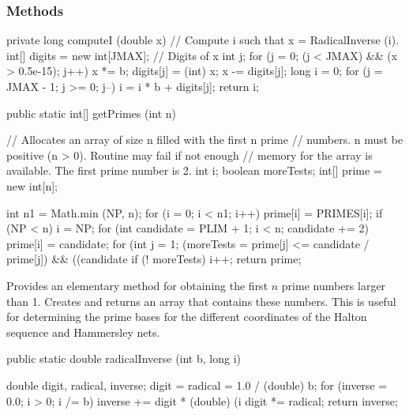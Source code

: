 \subsubsection* {Methods}
\begin{code}\begin{hide}
   private long computeI (double x) {
      // Compute i such that x = RadicalInverse (i).
      int[] digits = new int[JMAX];              // Digits of x
      int j;
      for (j = 0; (j < JMAX) && (x > 0.5e-15); j++) {
         x *= b;
         digits[j] = (int) x;
         x -= digits[j];
      }
      long i = 0;
      for (j = JMAX - 1; j >= 0; j--) {
         i = i * b + digits[j];
      }
      return i;
   }\end{hide}

   public static int[] getPrimes (int n) \begin{hide} {
      // Allocates an array of size n filled with the first n prime
      // numbers. n must be positive (n > 0). Routine may fail if not enough
      // memory for the array is available. The first prime number is 2. 
      int i;
      boolean moreTests;
      int[] prime = new int[n];

      int n1 = Math.min (NP, n);
      for (i = 0; i < n1; i++)
         prime[i] = PRIMES[i];
      if (NP < n) {
         i = NP;
         for (int candidate = PLIM + 1; i < n; candidate += 2) {
             prime[i] = candidate;
             for (int j = 1; (moreTests = prime[j] <= candidate / prime[j])
                     && ((candidate %
             if (! moreTests)
                 i++;
         }
      }
      return prime;
   }\end{hide}
\end{code}
 \begin{tabb}
   Provides an elementary method for obtaining the first $n$ prime
   numbers larger than 1. 
   Creates and returns an array that contains
   these numbers.  This is useful for determining the prime bases for
   the different coordinates of the Halton sequence and Hammersley nets.
 \end{tabb}
\begin{htmlonly}
\end{htmlonly}
\begin{code} 

   public static double radicalInverse (int b, long i) \begin{hide} {
      double digit, radical, inverse;
      digit = radical = 1.0 / (double) b;
      for (inverse = 0.0; i > 0; i /= b) {
         inverse += digit * (double) (i %
         digit *= radical;
      }
      return inverse;
   }\end{hide}
\end{code}
